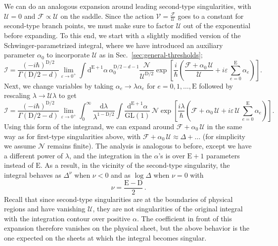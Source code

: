\documentclass[12pt]{article}
\numberwithin{figure}{section}
\def \be {\begin{equation}}
\def \ee {\end{equation}}
\def \D {\mathrm{D}}
\def \E {\mathrm{E}}
\def \U {\mathcal{U}}
\def \F {\mathcal{F}}
\def \d {\mathrm{d}}
\def \eps {\varepsilon}
\def \V {\mathcal{V}}
\def \I {\mathcal{I}}
\def \GL {\mathrm{GL}}
\def \N {\mathcal{N}}
\begin{document}
	We can do an analogous expansion around leading second-type singularities, with $\U=0$ and $\F \propto \U$ on the saddle. Since the action $\V=\frac{\F}{\U}$ goes to a constant for second-type branch points, we must make sure to factor $\U$ out of the exponential before expanding. To this end, we start with a slightly modified version of the Schwinger-parametrized integral, where we have introduced an auxiliary parameter $\alpha_0$ to incorporate $\U$ as in Sec.~\ref{sec:general-thresholds};
	\begin{equation} 
	    \I = \frac{(-i\hbar)^{\D/2}}{
	    \Gamma\left(\D/2-d \right)}
	    \lim_{\eps\to0^+} \int \d^{\E+1} \alpha \, \alpha_0^{\D/2-d-1} \frac{\N}{\U^{\D/2}} \exp \left[ \frac{i}{\hbar}\left(\frac{\F+\alpha_0 \, \U}{\U} + i\eps\, {\textstyle\sum_{e=0}^{\E}}\alpha_e\right)\right].
	\end{equation}
	Next, we change variables by taking $\alpha_e \to \lambda \alpha_e$ for $e = 0,1,\ldots,\E$ followed by rescaling $\lambda \to \U \lambda$ to get
	\begin{equation}
	    \I = \frac{(-i\hbar)^{\D/2}}{
	    \Gamma\left(\D/2-d \right)}
	    \lim_{\eps\to0^+} \int_0^\infty \frac{\d\lambda}{\lambda^{1-\D/2}} \int \frac{\d^{\E+1} \alpha}{\GL(1)}\, \N \exp \left[ \frac{i\lambda}{\hbar}\left(\F + \alpha_0 \, \U + i\eps\, \U \, {\textstyle\sum_{e=0}^{\E}}\alpha_e\right)\right].
	\end{equation}
	Using this form of the integrand, we can expand around $\F+\alpha_0 \, \U$ in the same way as for first-type singularities above, with $\F+\alpha_0 \, \U \approx \Delta + \ldots$ (for simplicity we assume $\N$ remains finite). The analysis is analogous to before, except we have a different power of $\lambda$, and the integration in the $\alpha$'s is over $\E+1$ parameters instead of $\E$. As a result, in the vicinity of the second-type singularity, the integral behaves as $\Delta^\nu$ when $\nu < 0$ and as $\log \Delta$ when $\nu = 0$ with
	\be 
	    \nu = \frac{\E-\D}{2} \,.
	\ee 
	Recall that since second-type singularities are at the boundaries of physical regions and have vanishing $\U$, they are not singularities of the original integral with the integration contour over positive $\alpha$. The coefficient in front of this expansion therefore vanishes on the physical sheet, but the above behavior is the one expected on the sheets at which the integral becomes singular.
		
\end{document}
